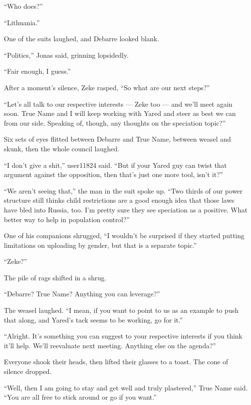 ``Who does?''

``Lithuania.''

One of the suits laughed, and Debarre looked blank.

``Politics,'' Jonas said, grinning lopsidedly.

``Fair enough, I guess.''

After a moment's silence, Zeke rasped, ``So what are our next steps?''

``Let's all talk to our respective interests — Zeke too — and we'll meet again soon. True Name and I will keep working with Yared and steer as best we can from our side. Speaking of, though, any thoughts on the speciation topic?''

Six sets of eyes flitted between Debarre and True Name, between weasel and skunk, then the whole council laughed.

``I don't give a shit,'' user11824 said. ``But if your Yared guy can twist that argument against the opposition, then that's just one more tool, isn't it?''

``We aren't seeing that,'' the man in the suit spoke up. ``Two thirds of our power structure still thinks child restrictions are a good enough idea that those laws have bled into Russia, too. I'm pretty sure they see speciation as a positive. What better way to help in population control?''

One of his companions shrugged, ``I wouldn't be surprised if they started putting limitations on uploading by gender, but that is a separate topic.''

``Zeke?''

The pile of rags shifted in a shrug.

``Debarre? True Name? Anything you can leverage?''

The weasel laughed. ``I mean, if you want to point to us as an example to push that along, and Yared's tack seems to be working, go for it.''

``Alright. It's something you can suggest to your respective interests if you think it'll help. We'll reevaluate next meeting. Anything else on the agenda?''

Everyone shook their heads, then lifted their glasses to a toast. The cone of silence dropped.

``Well, then I am going to stay and get well and truly plastered,'' True Name said. ``You are all free to stick around or go if you want.''
